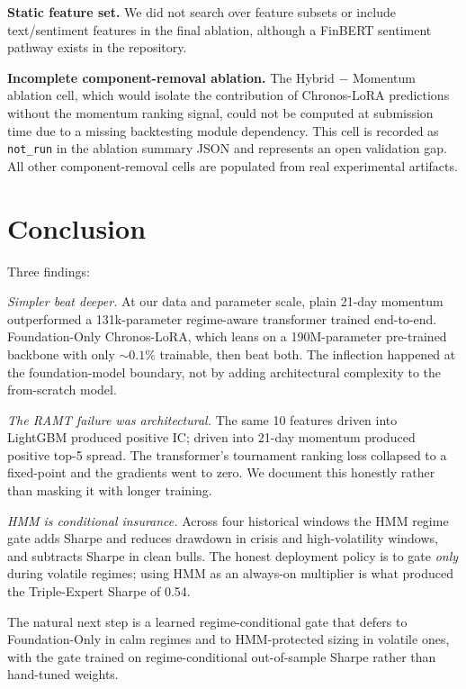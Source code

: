 \documentclass[conference]{IEEEtran}
\begin{document}
\textbf{Static feature set.} We did not search over feature subsets or
include text/sentiment features in the final ablation, although a FinBERT
sentiment pathway exists in the repository.

\textbf{Incomplete component-removal ablation.}
The Hybrid $-$ Momentum ablation cell, which would isolate the contribution
of Chronos-LoRA predictions without the momentum ranking signal, could not
be computed at submission time due to a missing backtesting module
dependency. This cell is recorded as \texttt{not\_run} in the ablation
summary JSON and represents an open validation gap. All other
component-removal cells are populated from real experimental artifacts.

\section{Conclusion}
Three findings:

\emph{Simpler beat deeper.} At our data and parameter scale, plain 21-day
momentum outperformed a 131k-parameter regime-aware transformer trained
end-to-end. Foundation-Only Chronos-LoRA, which leans on a 190M-parameter
pre-trained backbone with only ${\sim}0.1\%$ trainable, then beat both. The
inflection happened at the foundation-model boundary, not by adding
architectural complexity to the from-scratch model.

\emph{The RAMT failure was architectural.} The same 10 features driven into
LightGBM produced positive IC; driven into 21-day momentum produced positive
top-5 spread. The transformer's tournament ranking loss collapsed to a
fixed-point and the gradients went to zero. We document this honestly rather
than masking it with longer training.

\emph{HMM is conditional insurance.} Across four historical windows the HMM
regime gate adds Sharpe and reduces drawdown in crisis and high-volatility
windows, and subtracts Sharpe in clean bulls. The honest deployment policy is
to gate \emph{only} during volatile regimes; using HMM as an always-on
multiplier is what produced the Triple-Expert Sharpe of 0.54.

The natural next step is a learned regime-conditional gate that defers to
Foundation-Only in calm regimes and to HMM-protected sizing in volatile ones,
with the gate trained on regime-conditional out-of-sample Sharpe rather than
hand-tuned weights.



\end{document}
